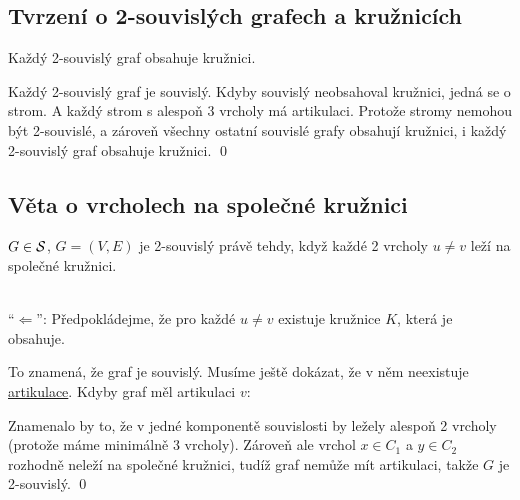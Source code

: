 \subsection{Tvrzení o 2-souvislých grafech a kružnicích}
Každý 2-souvislý graf obsahuje kružnici. 

 Každý 2-souvislý graf je souvislý. Kdyby souvislý neobsahoval kružnici, jedná se o strom. A každý strom s 
alespoň 3 vrcholy má artikulaci. Protože stromy nemohou být 2-souvislé, a zároveň všechny ostatní souvislé grafy 
obsahují kružnici, i každý 2-souvislý graf obsahuje kružnici.
\hspace{\fill}\qed

\subsection{Věta o vrcholech na společné kružnici}
$G \in \S$, $G = (V,E)$ je 2-souvislý právě tehdy, když každé 2 vrcholy $u \not= v$ leží na společné kružnici.

\\
\enquote{$\Leftarrow$}: Předpokládejme, že pro každé $u \not= v$ existuje kružnice $K$, která je obsahuje.

To znamená, že graf je souvislý. Musíme ještě dokázat, že v něm neexistuje \hyperref[artikulace]{artikulace}.
Kdyby graf měl artikulaci $v$: 
\begin{figure}[H]
    \centering
\end{figure}
Znamenalo by to, že v jedné komponentě souvislosti by ležely alespoň 2 vrcholy (protože máme minimálně 3 vrcholy). 
Zároveň ale vrchol $x \in C_1$ a $y \in C_2$ rozhodně neleží na společné kružnici, tudíž graf nemůže mít artikulaci, 
takže $G$ je 2-souvislý. 
\hspace{\fill}\qed

